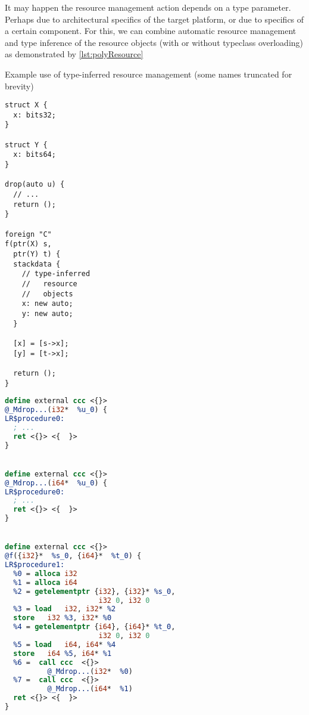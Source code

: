 It may happen the resource management action depends on a type parameter. Perhaps due to architectural specifics of the target platform, or due to specifics of a certain component. For this, we can combine automatic resource management and type inference of the resource objects (with or without typeclass overloading) as demonstrated by \cref{lst:polyResource}

\begin{listing}
    \small
    \caption{Example use of type-inferred resource management (some names truncated for brevity)}
    \label{lst:polyResource}
    \begin{center}
    \begin{minipage}{0.35\linewidth}
    \begin{lstlisting}
struct X {
  x: bits32;
}

struct Y {
  x: bits64;
}

drop(auto u) {
  // ...
  return ();
}

foreign "C"
f(ptr(X) s,
  ptr(Y) t) {
  stackdata {
    // type-inferred
    //   resource
    //   objects
    x: new auto;
    y: new auto;
  }

  [x] = [s->x];
  [y] = [t->x];

  return ();
}
    \end{lstlisting}
    \end{minipage}%
    \begin{minipage}{0.65\linewidth}
    \begin{lstlisting}[language=LLVM]
define external ccc <{}>
@_Mdrop...(i32*  %u_0) {
LR$procedure0:
  ; ...
  ret <{}> <{  }>
}


define external ccc <{}>
@_Mdrop...(i64*  %u_0) {
LR$procedure0:
  ; ...
  ret <{}> <{  }>
}


define external ccc <{}>
@f({i32}*  %s_0, {i64}*  %t_0) {
LR$procedure1:
  %0 = alloca i32
  %1 = alloca i64
  %2 = getelementptr {i32}, {i32}* %s_0,
                      i32 0, i32 0
  %3 = load   i32, i32* %2
  store   i32 %3, i32* %0
  %4 = getelementptr {i64}, {i64}* %t_0,
                      i32 0, i32 0
  %5 = load   i64, i64* %4
  store   i64 %5, i64* %1
  %6 =  call ccc  <{}>
          @_Mdrop...(i32*  %0)
  %7 =  call ccc  <{}>
          @_Mdrop...(i64*  %1)
  ret <{}> <{  }>
}
    \end{lstlisting}
    \end{minipage}
    \end{center}
\end{listing}

